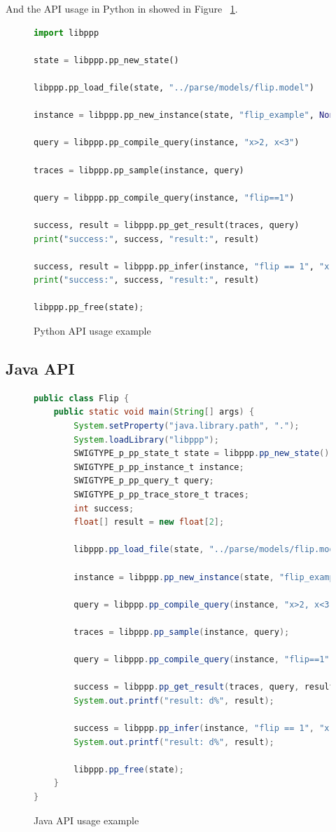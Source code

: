 And the API usage in Python in showed in Figure ~\ref{fig:python}.

\begin{figure}
\begin{lstlisting}[language=Python]
import libppp

state = libppp.pp_new_state()

libppp.pp_load_file(state, "../parse/models/flip.model")

instance = libppp.pp_new_instance(state, "flip_example", None)

query = libppp.pp_compile_query(instance, "x>2, x<3")

traces = libppp.pp_sample(instance, query)

query = libppp.pp_compile_query(instance, "flip==1")

success, result = libppp.pp_get_result(traces, query)
print("success:", success, "result:", result)

success, result = libppp.pp_infer(instance, "flip == 1", "x > 2, x < 3")
print("success:", success, "result:", result)

libppp.pp_free(state); 
\end{lstlisting}
\caption{Python API usage example}
\label{fig:python}
\end{figure}

\subsection{Java API}
\begin{figure}
\begin{lstlisting}[language=Java]
public class Flip {
    public static void main(String[] args) {
        System.setProperty("java.library.path", ".");
        System.loadLibrary("libppp");
        SWIGTYPE_p_pp_state_t state = libppp.pp_new_state();
        SWIGTYPE_p_pp_instance_t instance;
        SWIGTYPE_p_pp_query_t query;
        SWIGTYPE_p_pp_trace_store_t traces;
        int success;
        float[] result = new float[2];

        libppp.pp_load_file(state, "../parse/models/flip.model");

        instance = libppp.pp_new_instance(state, "flip_example", null);

        query = libppp.pp_compile_query(instance, "x>2, x<3");

        traces = libppp.pp_sample(instance, query);

        query = libppp.pp_compile_query(instance, "flip==1");

        success = libppp.pp_get_result(traces, query, result);
        System.out.printf("result: d%", result);

        success = libppp.pp_infer(instance, "flip == 1", "x > 2, x < 3", result);
        System.out.printf("result: d%", result);

        libppp.pp_free(state);
    }
}
\end{lstlisting}
\caption{Java API usage example}
\label{fig:java}
\end{figure}

